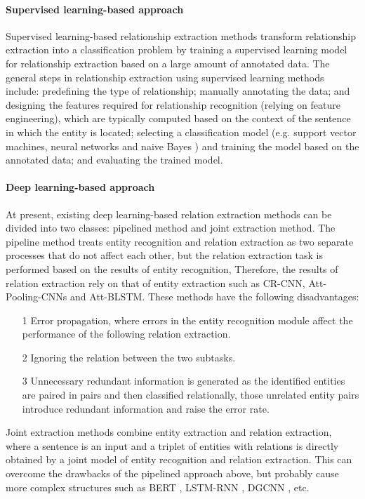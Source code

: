 \documentclass[%
 aip,
 jmp,%
 amsmath,amssymb,
 reprint,%
]{revtex4-2}
\begin{document}
\paragraph{Supervised learning-based approach}
Supervised learning-based relationship extraction methods transform relationship extraction into a classification problem by training a supervised learning model for relationship extraction based on a large amount of annotated data\cite{onishi2018relation, timoshenko2017supervised, ciaburro2021machine}. The general steps in relationship extraction using supervised learning methods include: predefining the type of relationship; manually annotating the data; and designing the features required for relationship recognition (relying on feature engineering\cite{turner1999conceptual}), which are typically computed based on the context of the sentence in which the entity is located; selecting a classification model (e.g. support vector machines\cite{huang2018applications}, neural networks and naive Bayes \cite{frasconi2001text}) and training the model based on the annotated data; and evaluating the trained model.

\paragraph{Deep learning-based approach}
At present, existing deep learning-based relation extraction methods can be divided into two classes: pipelined method and joint extraction method\cite{zheng2017joint}.
The pipeline method treats entity recognition and relation extraction as two separate processes that 
do not affect each other, but the relation extraction task is performed based on the results of entity recognition,
Therefore, the results of relation extraction rely on that of entity extraction such as CR-CNN\cite{nogueira2015classifying},
Att-Pooling-CNNs\cite{li2018attention} and Att-BLSTM\cite{chen2018wifi}. These methods have the following disadvantages:
\begin{itemize}
    \item[1] Error propagation, where errors in the entity recognition module affect the performance of the following relation extraction.
    \item[2] Ignoring the relation between the two subtasks.
    \item[3] Unnecessary redundant information is generated as the identified entities are paired in pairs and then classified relationally, those unrelated entity pairs introduce redundant information and raise the error rate.
\end{itemize}
Joint extraction methods\cite{miwa2014modeling} combine entity extraction and relation extraction, where a sentence is an input and a triplet of entities with relations is directly obtained by a joint model of entity recognition and relation extraction. This can overcome the drawbacks of the pipelined approach above, but probably cause more complex structures such as BERT \cite{tenney2019bert}, LSTM-RNN \cite{selvin2017stock}, DGCNN \cite{phan2018dgcnn}, etc.
\end{document}
